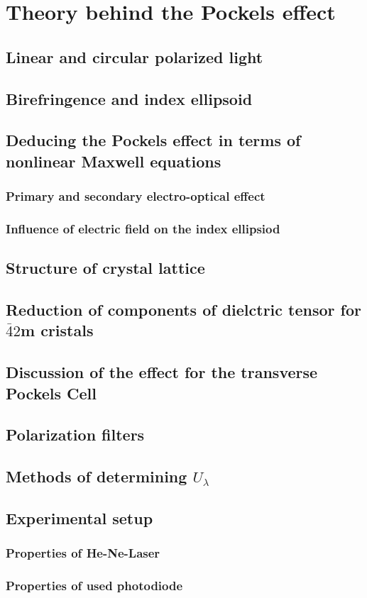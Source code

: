 \section{Theory behind the Pockels effect}

\subsection{Linear and circular polarized light}

\subsection{Birefringence and index ellipsoid}

\subsection{Deducing the Pockels effect in terms of nonlinear Maxwell equations}
\subsubsection{Primary and secondary electro-optical effect}
\subsubsection{Influence of electric field on the index ellipsiod}

\subsection{Structure of crystal lattice}

\subsection{Reduction of components of dielctric tensor for $\bar{4}2$m cristals}

\subsection{Discussion of the effect for the transverse Pockels Cell}

\subsection{Polarization filters}

\subsection{Methods of determining $U_\lambda$}

\subsection{Experimental setup}
\subsubsection{Properties of He-Ne-Laser}
\subsubsection{Properties of used photodiode}
